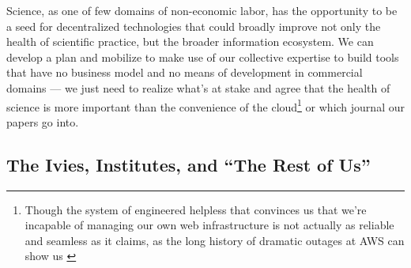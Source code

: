 \documentclass[10pt]{article}
\begin{document}
\begin{multicols}{2}
Science, as one of few domains of non-economic labor, has the
opportunity to be a seed for decentralized technologies that could
broadly improve not only the health of scientific practice, but the
broader information ecosystem. We can develop a plan and mobilize to
make use of our collective expertise to build tools that have no
business model and no means of development in commercial domains --- we
just need to realize what's at stake and agree that the health of
science is more important than the convenience of the cloud\footnote{Though
  the system of engineered helpless that convinces us that we're
  incapable of managing our own web infrastructure is not actually as
  reliable and seamless as it claims, as the long history of dramatic
  outages at AWS can show us \cite{lawlerAmazonServerOutage2021, hutchinsonAmazonWebServices2012} } or which journal our papers go
into. 
\end{multicols}


\hypertarget{the-ivies-institutes-and-the-rest-of-us}{%
\subsection{The Ivies, Institutes, and ``The Rest of
Us''}\label{the-ivies-institutes-and-the-rest-of-us}}
\end{document}

